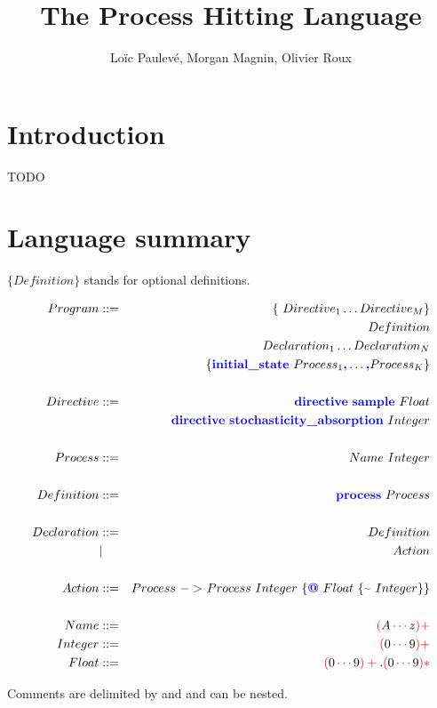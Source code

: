 \documentclass[11pt]{article}
\title{The Process Hitting Language}
\author{Lo\"ic Paulev\'e, Morgan Magnin, Olivier Roux}
\newcommand{\term}[1]{\text{\color{blue}\textbf{#1}}}
\newcommand{\regexp}[1]{{\color{red}#1}}
\newcommand{\ch}[1]{{\color{black}#1}}
\begin{document}
\maketitle

\section{Introduction}

TODO

\newpage
\section{Language summary}

$\{ Definition \}$ stands for optional definitions.

\begin{eqnarray*}
Program &::=& \{ Directive_1 \dots Directive_M \}\\
&& Definition \\
&& Declaration_1 \dots Declaration_N\\
&& \{ \term{initial\_state}~Process_1\term{,}\dots\term{,} Process_K \}\\
\\
Directive &::=& \term{directive}~\term{sample}~Float \\
&& \term{directive}~\term{stochasticity\_absorption}~Integer\\
\\
Process &::=& Name~Integer\\
\\
Definition &::=& \term{process}~Process\\
\\
Declaration &::=& Definition \\
& | & Action\\
\\
Action &::=& Process~\term{$->$}~Process~Integer~\{\term{@}~Float~\{\term{\textasciitilde}~Integer\}\}\\
\\
Name & ::= & \regexp{(\ch{A}\cdots \ch{z})+}\\
Integer & ::= & \regexp{(\ch{0}\cdots \ch{9})+}\\
Float & ::= & \regexp{(\ch{0}\cdots \ch{9})+ \ch{.} (\ch{0}\cdots \ch{9})*}\\
\end{eqnarray*}

Comments are delimited by \term{(*} and \term{*)} and can be nested.
\end{document}
